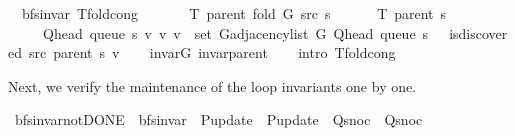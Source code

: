 \begin{isabellebody}
{\isafoldproof}%
%
\isadelimproof
\isanewline
%
\endisadelimproof
\isanewline
{}\isamarkupfalse%
\ {\isacharparenleft}{\kern0pt}\ bfs{\isacharunderscore}{\kern0pt}invar{\isacharparenright}{\kern0pt}\ T{\isacharunderscore}{\kern0pt}fold{\isacharunderscore}{\kern0pt}cong{\isacharcolon}{\kern0pt}\isanewline
\ \ \isanewline
\ \ \ \ {\isachardoublequoteopen}T\ {\isacharparenleft}{\kern0pt}parent\ {\isacharparenleft}{\kern0pt}fold\ G\ src\ s{\isacharparenright}{\kern0pt}{\isacharparenright}{\kern0pt}\ {\isacharequal}{\kern0pt}\isanewline
\ \ \ \ \ T\ {\isacharparenleft}{\kern0pt}parent\ s{\isacharparenright}{\kern0pt}\ {\isasymunion}\isanewline
\ \ \ \ \ {\isacharbraceleft}{\kern0pt}{\isacharparenleft}{\kern0pt}Q{\isacharunderscore}{\kern0pt}head\ {\isacharparenleft}{\kern0pt}queue\ s{\isacharparenright}{\kern0pt}{\isacharcomma}{\kern0pt}\ v{\isacharparenright}{\kern0pt}\ {\isacharbar}{\kern0pt}v{\isachardot}{\kern0pt}\ v\ {\isasymin}\ set\ {\isacharparenleft}{\kern0pt}G{\isachardot}{\kern0pt}adjacency{\isacharunderscore}{\kern0pt}list\ G\ {\isacharparenleft}{\kern0pt}Q{\isacharunderscore}{\kern0pt}head\ {\isacharparenleft}{\kern0pt}queue\ s{\isacharparenright}{\kern0pt}{\isacharparenright}{\kern0pt}{\isacharparenright}{\kern0pt}\ {\isasymand}\ {\isasymnot}\ is{\isacharunderscore}{\kern0pt}discovered\ src\ {\isacharparenleft}{\kern0pt}parent\ s{\isacharparenright}{\kern0pt}\ v{\isacharbraceright}{\kern0pt}{\isachardoublequoteclose}\isanewline
%
\isadelimproof
\ \ %
\endisadelimproof
%
\isatagproof
{}\isamarkupfalse%
\ invar{\isacharunderscore}{\kern0pt}G\ invar{\isacharunderscore}{\kern0pt}parent\isanewline
\ \ \isamarkupfalse%
\ {\isacharparenleft}{\kern0pt}intro\ T{\isacharunderscore}{\kern0pt}fold{\isacharunderscore}{\kern0pt}cong{\isacharunderscore}{\kern0pt}{}{\isacharparenright}{\kern0pt}%
\endisatagproof
{\isafoldproof}%
%
\isadelimproof
%
\endisadelimproof
%
\begin{isamarkuptext}%
Next, we verify the maintenance of the loop invariants one by one.%
\end{isamarkuptext}\isamarkuptrue%
\isamarkupfalse%
\ bfs{\isacharunderscore}{\kern0pt}invar{\isacharunderscore}{\kern0pt}not{\isacharunderscore}{\kern0pt}DONE\ {\isacharequal}{\kern0pt}\ bfs{\isacharunderscore}{\kern0pt}invar\ \ P{\isacharunderscore}{\kern0pt}update\ {\isacharequal}{\kern0pt}\ P{\isacharunderscore}{\kern0pt}update\ \ Q{\isacharunderscore}{\kern0pt}snoc\ {\isacharequal}{\kern0pt}\ Q{\isacharunderscore}{\kern0pt}snoc\ \isanewline

\end{isabellebody}
